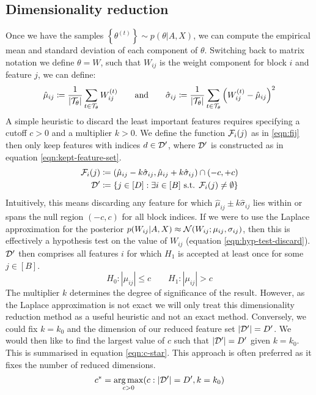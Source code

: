 \subsection{Dimensionality reduction}
\label{sec:dim-reduction}

Once we have the samples $\left\{ \theta^{(t)} \right\} \sim p(\theta | A, X)$, we can compute the empirical mean and standard deviation of each component of $\theta$. Switching back to matrix notation we define $\theta = W$, such that $W_{ij}$ is the weight component for block $i$ and feature $j$, we can define:
%
\begin{equation}
	\hat{\mu}_{ij} \coloneqq \frac{1}{|\mathcal{T}_\theta|} \sum_{t \in \mathcal{T}_\theta} W_{ij}^{(t)} \qquad \textrm{and} \qquad
	\hat{\sigma}_{ij} \coloneqq \frac{1}{|\mathcal{T}_\theta|} \sum_{t \in \mathcal{T}_\theta} \left( W_{ij}^{(t)} - \hat{\mu}_{ij} \right)^2
\end{equation}
%
A simple heuristic to discard the least important features requires specifying a cutoff $c > 0$ and a multiplier $k > 0$. We define the function $\mathcal{F}_i(j)$ as in \ref{eqn:fij} then only keep features with indices $d \in \mathcal{D}'$, where $\mathcal{D}'$ is constructed as in equation \ref{eqn:kept-feature-set}.
%
\begin{align}
	\mathcal{F}_i(j) &\coloneqq (\hat{\mu}_{ij} - k \hat{\sigma}_{ij}, \hat{\mu}_{ij} + k \hat{\sigma}_{ij}) \cap (-c, +c)
	\label{eqn:fij} \\
	\mathcal{D}' &\coloneqq \left\{ j \in [D] : \exists i \in [B] \textrm{ s.t. }  \mathcal{F}_i(j) \neq \emptyset \right\}
	\label{eqn:kept-feature-set}
\end{align}
%
Intuitively, this means discarding any feature for which $\hat{\mu}_{ij} \pm k\hat{\sigma}_{ij}$ lies within or spans the null region $(-c, c)$ for all block indices. If we were to use the Laplace approximation for the posterior $p(W_{ij} | A, X) \approx \mathcal{N}(W_{ij}; \mu_{ij}, \sigma_{ij})$, then this is effectively a hypothesis test on the value of $W_{ij}$ (equation \ref{eqn:hyp-test-discard}). $\mathcal{D}'$ then comprises all features $i$ for which $H_1$ is accepted at least once for some $j \in [B]$.
%
\begin{equation}
	H_0: |\mu_{ij}| \leq c \qquad
	H_1: |\mu_{ij}| > c
	\label{eqn:hyp-test-discard}
\end{equation}
%
The multiplier $k$ determines the degree of significance of the result. However, as the Laplace approximation is not exact we will only treat this dimensionality reduction method as a useful heuristic and not an exact method. Conversely, we could fix $k=k_0$ and the dimension of our reduced feature set $|\mathcal{D}'|=D'$. We would then like to find the largest value of $c$ such that $|\mathcal{D}'|=D'$ given $k=k_0$. This is summarised in equation \ref{eqn:c-star}. This approach is often preferred as it fixes the number of reduced dimensions.
%
\begin{equation}
	c^* = \operatorname*{arg\,max}_{c>0} (c : |\mathcal{D}'| = D', k=k_0)
	\label{eqn:c-star}
\end{equation}